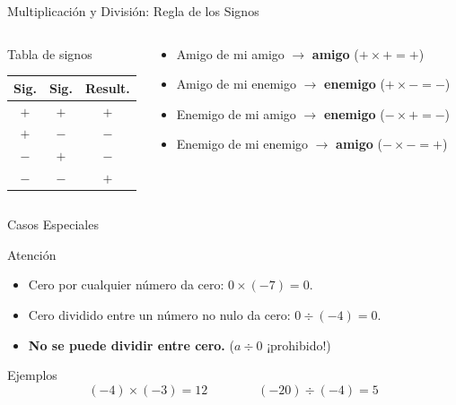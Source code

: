 \documentclass[aspectratio=169]{beamer}
\begin{document}
\begin{frame}{Multiplicación y División: Regla de los Signos}
  \begin{columns}[T]
    \begin{block}{Tabla de signos}
      \begin{center}
        \begin{tabular}{cc|c}
          \toprule
          \textbf{Sig.} & \textbf{Sig.} & \textbf{Result.} \\
          \midrule
          $+$ & $+$ & $+$ \\
          $+$ & $-$ & $-$ \\
          $-$ & $+$ & $-$ \\
          $-$ & $-$ & $+$ \\
          \bottomrule
        \end{tabular}
      \end{center}
    \end{block}
    \begin{mwextra}
      \begin{itemize}
        \item Amigo de mi amigo $\rightarrow$ \textbf{amigo} \quad ($+\times +=+$)
        \item Amigo de mi enemigo $\rightarrow$ \textbf{enemigo} \quad ($+\times -= -$)
        \item Enemigo de mi amigo $\rightarrow$ \textbf{enemigo} \quad ($-\times +=-$)
        \item Enemigo de mi enemigo $\rightarrow$ \textbf{amigo} \quad ($-\times -=+$)
      \end{itemize}
    \end{mwextra}
  \end{columns}
\end{frame}

\begin{frame}{Casos Especiales}
  \begin{alertblock}{Atención}
    \begin{itemize}
      \item Cero por cualquier número da cero: \quad $0 \times (-7) = 0$.
      \item Cero dividido entre un número no nulo da cero: \quad $0 \div (-4) = 0$.
      \item \textbf{No se puede dividir entre cero.} \quad ($a \div 0$ \quad ¡prohibido!)
    \end{itemize}
  \end{alertblock}
  \vspace{6pt}
  \begin{block}{Ejemplos}
    \[
      (-4) \times (-3) = 12 \qquad\qquad (-20) \div (-4) = 5
    \]
  \end{block}
\end{frame}
\end{document}
